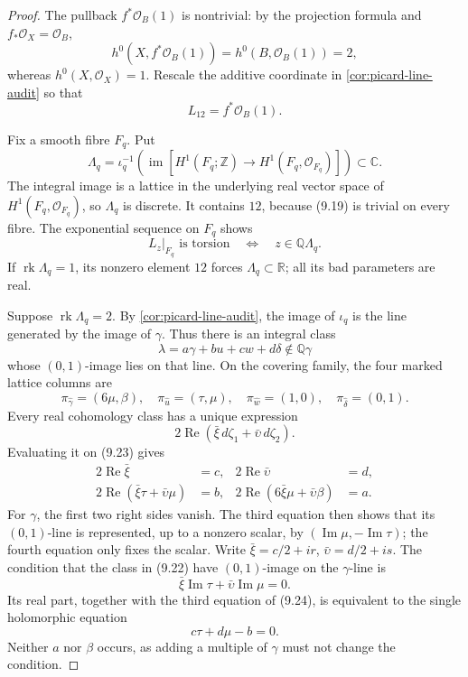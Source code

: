 \begin{proof}
The pullback \(f^*\mathcal O_B(1)\) is nontrivial: by the projection
formula and \(f_*\mathcal O_X=\mathcal O_B\),
\[
 h^0(X,f^*\mathcal O_B(1))=h^0(B,\mathcal O_B(1))=2,
\]
whereas \(h^0(X,\mathcal O_X)=1\).  Rescale the additive coordinate in
\cref{cor:picard-line-audit} so that
\[
 L_{12}=f^*\mathcal O_B(1).
\tag{9.19}
\]

Fix a smooth fibre \(F_q\).  Put
\[
 \Lambda_q=\iota_q^{-1}\!\left(
 \operatorname{im}[H^1(F_q;\mathbb Z)\to
 H^1(F_q,\mathcal O_{F_q})]\right)\subset\mathbb C.
\tag{9.20}
\]
The integral image is a lattice in the underlying real vector space of
\(H^1(F_q,\mathcal O_{F_q})\), so \(\Lambda_q\) is discrete.  It contains
\(12\), because (9.19) is trivial on every fibre.  The exponential
sequence on \(F_q\) shows
\[
 L_z|_{F_q}\text{ is torsion}
 \quad\Longleftrightarrow\quad z\in\mathbb Q\Lambda_q.
\tag{9.21}
\]
If \(\operatorname{rk}\Lambda_q=1\), its nonzero element \(12\) forces
\(\Lambda_q\subset\mathbb R\); all its bad parameters are real.

Suppose \(\operatorname{rk}\Lambda_q=2\).  By
\cref{cor:picard-line-audit}, the image of \(\iota_q\) is the line
generated by the image of \(\gamma\).  Thus there is an integral class
\[
 \lambda=a\gamma+bu+cw+d\delta\notin\mathbb Q\gamma
\tag{9.22}
\]
whose \((0,1)\)-image lies on that line.  On the covering family, the four
marked lattice columns are
\[
 \pi_{\widehat\gamma}=(6\mu,\beta),\quad
 \pi_{\widehat u}=(\tau,\mu),\quad
 \pi_{\widehat w}=(1,0),\quad
 \pi_{\widehat\delta}=(0,1).
\tag{9.23}
\]
Every real cohomology class has a unique expression
\[
 2\operatorname{Re}(\bar\xi\,d\zeta_1+
                       \bar\upsilon\,d\zeta_2).
\]
Evaluating it on (9.23) gives
\[
\begin{aligned}
2\operatorname{Re}\bar\xi&=c,&
2\operatorname{Re}\bar\upsilon&=d,\\
2\operatorname{Re}(\bar\xi\tau+\bar\upsilon\mu)&=b,&
2\operatorname{Re}(6\bar\xi\mu+\bar\upsilon\beta)&=a.
\end{aligned}
\tag{9.24}
\]
For \(\gamma\), the first two right sides vanish.  The third equation then
shows that its \((0,1)\)-line is represented, up to a nonzero scalar, by
\((\operatorname{Im}\mu,-\operatorname{Im}\tau)\); the fourth equation
only fixes the scalar.  Write
\(\bar\xi=c/2+ir\), \(\bar\upsilon=d/2+is\).  The condition that the class
in (9.22) have \((0,1)\)-image on the \(\gamma\)-line is
\[
 \bar\xi\operatorname{Im}\tau+
 \bar\upsilon\operatorname{Im}\mu=0.
\]
Its real part, together with the third equation of (9.24), is equivalent
to the single holomorphic equation
\[
 c\tau+d\mu-b=0.
\tag{9.25}
\]
Neither \(a\) nor \(\beta\) occurs, as adding a multiple of \(\gamma\)
must not change the condition.


\end{proof}
